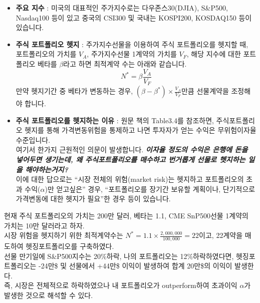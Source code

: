 \documentclass[
  letterpaper,
  DIV=11,
  numbers=noendperiod]{scrreprt}
\begin{document}
\begin{itemize}
\item
  \textbf{주요 지수} : 미국의 대표적인 주가지수로는 다우존스30(DJIA),
  S\&P500, Nasdaq100 등이 있고 중국의 CSI300 및 국내는 KOSPI200,
  KOSDAQ150 등이 있습니다.
\item
  \textbf{주식 포트폴리오 헷지} : 주가지수선물을 이용하여 주식
  포트폴리오를 헷지할 때, 포트폴리오의 가치를 \(V_A\), 주가지수선물
  1계약의 가치를 \(V_F\), 해당 지수에 대한 포트폴리오 베타를
  \(\beta\)라고 하면 최적계약 수는 아래와 같습니다.
  \[N^*=\beta\frac{V_A}{V_F}\] 만약 헷지기간 중 베타가 변동하는 경우,
  \((\beta - \beta ^*)\times\frac{V_A}{V_F}\)만큼 선물계약을 조정해야
  합니다.
\item
  \textbf{주식 포트폴리오를 헷지하는 이유} : 원문 책의 Table3.4를
  참조하면, 주식포트폴리오 헷지를 통해 가격변동위험을 통제하고 나면
  투자자가 얻는 수익은 무위험이자율 수준입니다.\\
  여기서 한가지 근원적인 의문이 발생합니다. \textbf{\emph{이자율 정도의
  수익은 은행에 돈을 넣어두면 생기는데, 왜 주식포트폴리오를 매수하고
  번거롭게 선물로 헷지하는 일을 해야하는거지?}}\\
  이에 대한 답으로는 ``시장 전체의 위험(market risk)는 헷지하고
  포트폴리오의 초과 수익(\(\alpha\))만 얻고싶은'' 경우, ``포트폴리오를
  장기간 보유할 계획이나, 단기적으로 가격변동에 대한 헷지가 필요''한
  경우 등이 있습니다.
\end{itemize}

\begin{tcolorbox}[enhanced jigsaw, toprule=.15mm, breakable, left=2mm, leftrule=.75mm, opacitybacktitle=0.6, coltitle=black, rightrule=.15mm, colback=white, titlerule=0mm, bottomtitle=1mm, colframe=quarto-callout-note-color-frame, title=\textcolor{quarto-callout-note-color}{\faInfo}\hspace{0.5em}{시장위험 헷지 예시}, toptitle=1mm, arc=.35mm, colbacktitle=quarto-callout-note-color!10!white, opacityback=0, bottomrule=.15mm]

현재 주식 포트폴리오의 가치는 200만 달러, 베타는 1.1, CME SnP500선물
1계약의 가치는 10만 달러라고 하자.\\
시장 위험을 헷지하기 위한 최적계약수는
\(N^*=1.1\times\frac{2,000,000}{100,000}=22\)이고, 22계약을 매도하여
헷징포트폴리오를 구축하였다.\\
선물 만기일에 S\&P500지수는 20\%하락, 나의 포트폴리오는
12\%하락하였다면, 헷징포트폴리오는 -24만\$ 및 선물에서 +44만\$ 이익이
발생하여 합계 20만\$의 이익이 발생한다.\\
즉, 시장은 전체적으로 하락하였으나 내 포트폴리오가 outperform하여
초과이익 \(\alpha\)가 발생한 것으로 해석할 수 있다.

\end{tcolorbox}
\end{document}
